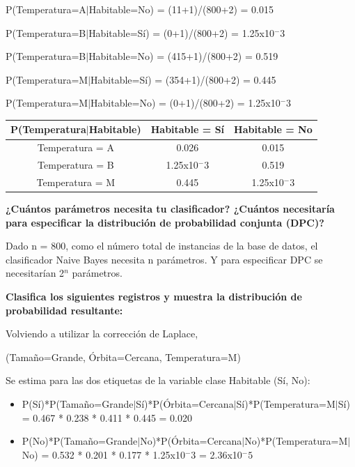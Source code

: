 \documentclass[11pt]{exam}
\begin{document}
\begin{questions}
P(Temperatura=A$|$Habitable=No) = (11+1)/(800+2) = 0.015

P(Temperatura=B$|$Habitable=Sí) = (0+1)/(800+2) = 1.25x10$^-3$

P(Temperatura=B$|$Habitable=No) = (415+1)/(800+2) = 0.519

P(Temperatura=M$|$Habitable=Sí) = (354+1)/(800+2) = 0.445

P(Temperatura=M$|$Habitable=No) = (0+1)/(800+2) = 1.25x10$^-3$

\begin{center}
	\begin{tabular}{ |c|c|c| } 
		\hline
		P(Temperatura$|$Habitable) & Habitable = Sí & Habitable = No \\
		\hline
		Temperatura = A & 0.026 & 0.015 \\ 
		\hline
		Temperatura = B & 1.25x10$^-3$ & 0.519 \\ 
		\hline
		Temperatura = M & 0.445 & 1.25x10$^-3$ \\ 
		\hline
	\end{tabular}
\end{center}

{\bf \question ¿Cuántos parámetros necesita tu clasificador? ¿Cuántos necesitaría para especificar la distribución de probabilidad conjunta (DPC)?}

Dado n = 800, como el número total de instancias de la base de datos, el clasificador Naive Bayes necesita n parámetros. Y para especificar DPC se necesitarían 2$^n$ parámetros.

{{\bf \question Clasifica los siguientes registros y muestra la distribución de probabilidad resultante:}
	
Volviendo a utilizar la corrección de Laplace,

\begin{enumerate}
	{\bf \item (Tamaño=Grande, Órbita=Cercana, Temperatura=M)}
	
	Se estima para las dos etiquetas de la variable clase Habitable (Sí, No): 
	
	\begin{itemize}
		\item P(Sí)*P(Tamaño=Grande$|$Sí)*P(Órbita=Cercana$|$Sí)*P(Temperatura=M$|$Sí) = 0.467 * 0.238 * 0.411 * 0.445 = 0.020 
		
		\item P(No)*P(Tamaño=Grande$|$No)*P(Órbita=Cercana$|$No)*P(Temperatura=M$|$No) = 0.532 * 0.201 * 0.177 * 1.25x10$^-3$ = 2.36x10$^-5$


\end{itemize}
\end{enumerate}}
\end{questions}
\end{document}
